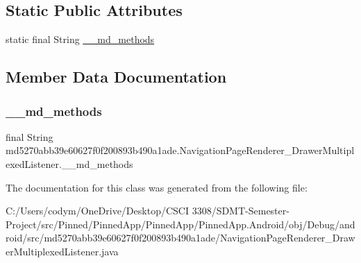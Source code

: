 \subsection*{Static Public Attributes}
\begin{DoxyCompactItemize}
\item 
static final String \hyperlink{classmd5270abb39e60627f0f200893b490a1ade_1_1_navigation_page_renderer___drawer_multiplexed_listener_afbd57ba6663a7c518799ec5668b08d40}{\+\_\+\+\_\+md\+\_\+methods}
\end{DoxyCompactItemize}


\subsection{Member Data Documentation}
\mbox{\label{classmd5270abb39e60627f0f200893b490a1ade_1_1_navigation_page_renderer___drawer_multiplexed_listener_afbd57ba6663a7c518799ec5668b08d40}} 
\subsubsection{\texorpdfstring{\+\_\+\+\_\+md\+\_\+methods}{\_\_md\_methods}}
{\footnotesize\ttfamily final String md5270abb39e60627f0f200893b490a1ade.\+Navigation\+Page\+Renderer\+\_\+\+Drawer\+Multiplexed\+Listener.\+\_\+\+\_\+md\+\_\+methods\hspace{0.3cm}{\ttfamily [static]}}



The documentation for this class was generated from the following file\+:\begin{DoxyCompactItemize}
\item 
C\+:/\+Users/codym/\+One\+Drive/\+Desktop/\+C\+S\+C\+I 3308/\+S\+D\+M\+T-\/\+Semester-\/\+Project/src/\+Pinned/\+Pinned\+App/\+Pinned\+App/\+Pinned\+App.\+Android/obj/\+Debug/android/src/md5270abb39e60627f0f200893b490a1ade/Navigation\+Page\+Renderer\+\_\+\+Drawer\+Multiplexed\+Listener.\+java\end{DoxyCompactItemize}
